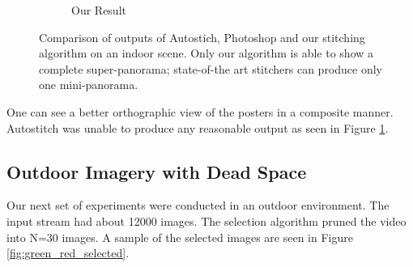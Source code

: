 \begin{figure}
\begin{subfigure}[b]{0.3\textwidth}
\caption{Our Result}
\end{subfigure}
\caption{Comparison of outputs of Autostich, Photoshop and our stitching
algorithm on an indoor scene. Only our
algorithm is able to show a complete super-panorama; state-of-the art
stitchers can produce only one mini-panorama.}
\label{fig:idc_indoor_comparison}
\end{figure}

One can see a better orthographic view of the posters in a composite
manner. Autostitch was unable to produce any reasonable output as seen in
Figure \ref{fig:idc_indoor_comparison}.

\subsection{Outdoor Imagery with Dead Space}
Our next set of experiments were conducted in an outdoor environment. The  
input stream had about 12000 images. The selection algorithm pruned the video
into N=30 images. A sample of the selected images are seen in Figure
\ref{fig:green_red_selected}.

